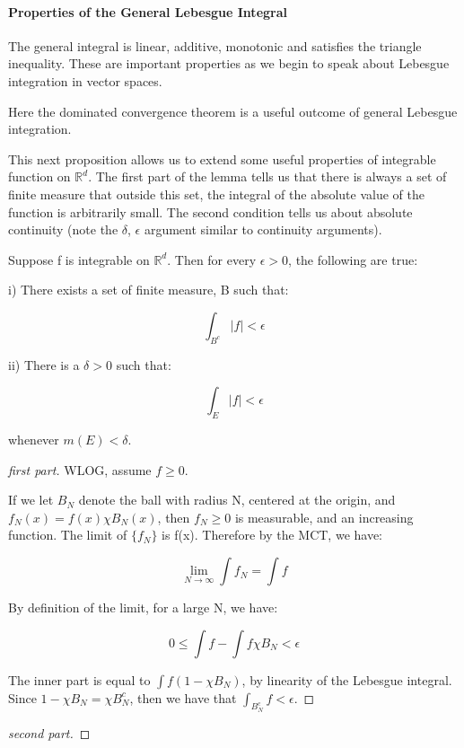 \documentclass[class=article, crop=false]{standalone}
\begin{document}
		\paragraph{Properties of the General Lebesgue Integral}
		The general integral is linear, additive, monotonic and satisfies the triangle inequality. These are important properties as we begin to speak about Lebesgue integration in vector spaces.

		Here the dominated convergence theorem is a useful outcome of general Lebesgue integration.

		This next proposition allows us to extend some useful properties of integrable function on $\mathbb{R}^d$. The first part of the lemma tells us that there is always a set of finite measure that outside this set, the integral of the absolute value of the function is arbitrarily small. The second condition tells us about absolute continuity (note the $\delta$, $\epsilon$ argument similar to continuity arguments).

		\begin{lemma} 
		Suppose f is integrable on $\mathbb{R}^d$. Then for every $\epsilon > 0$, the following are true:

		i) There exists a set of finite measure, B such that:

			$$\int_{B^c} |f| < \epsilon$$

		ii) There is a $\delta > 0$ such that:

			$$\int_E |f| < \epsilon$$

		whenever $m(E) < \delta$.
		\end{lemma}
		\begin{proof} [first part]
			WLOG, assume $f \ge 0$.

			If we let $B_N$ denote the ball with radius N, centered at the origin, and $f_N(x) = f(x) \chi B_N(x)$, then $f_N \ge 0$ is measurable, and an increasing function. The limit of $\{f_N\}$ is f(x). Therefore by the MCT, we have:

				$$\lim_{N\rightarrow\infty} \int f_N = \int f$$

			By definition of the limit, for a large N, we have:

				$$0 \le \int f - \int f \chi B_N < \epsilon$$

			The inner part is equal to $\int f (1 - \chi B_N)$, by linearity of the Lebesgue integral. Since $1 - \chi B_N = \chi B_N^c$, then we have that $\int_{B_N^c} f < \epsilon$.
		\end{proof}
		\begin{proof} [second part]

		\end{proof}
\end{document}
